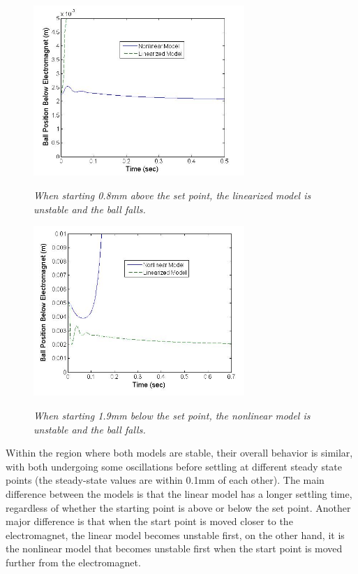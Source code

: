 \documentclass{article}
\theoremstyle{plain}
\theoremstyle{definition}
\theoremstyle{remark}
\begin{document}
\begin{figure}[htb]
\begin{center}
\includegraphics[width = 8cm]{Part2bCloseDisturbance.jpg}
\caption{\emph{When starting 0.8mm above the set point, the linearized model is unstable and the ball falls.}}
\label{Q2_b5}
\includegraphics[width = 8cm]{Part2bFarDisturbance.jpg}
\caption{\emph{When starting 1.9mm below the set point, the nonlinear model is unstable and the ball falls.}}
\label{Q2_b6}
\end{center}
\end{figure}

Within the region where both models are stable, their overall behavior is similar, with both undergoing some oscillations before settling at different steady state points (the steady-state values are within 0.1mm of each other). The main difference between the models is that the linear model has a longer settling time, regardless of whether the starting point is above or below the set point. Another major difference is that when the start point is moved closer to the electromagnet, the linear model becomes unstable first, on the other hand, it is the nonlinear model that becomes unstable first when the start point is moved further from the electromagnet. 
\end{document}
